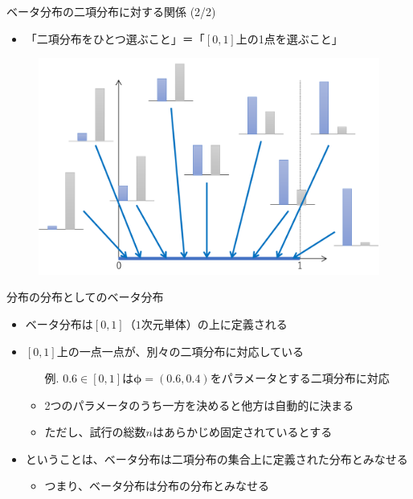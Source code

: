 \documentclass[aspectratio=169,unicode,dvipdfmx,14pt]{beamer}
\begin{document}
\begin{frame}{ベータ分布の二項分布に対する関係 (2/2)}
\begin{itemize}
\item 「二項分布をひとつ選ぶこと」＝「$[0,1]$上の1点を選ぶこと」
\end{itemize}
\begin{figure}[t]
\begin{center}
\includegraphics[scale=0.13]{beta2.png}
\end{center}
\end{figure}
\end{frame}

\begin{frame}{分布の分布としてのベータ分布}
\begin{itemize}
\item ベータ分布は$[0,1]$（$1$次元単体）の上に定義される
\item $[0,1]$上の一点一点が、別々の二項分布に対応している
\begin{itemize}
\item[例.] $0.6\in[0,1]$は$\bm{\phi}=(0.6,0.4)$をパラメータとする二項分布に対応
\item 2つのパラメータのうち一方を決めると他方は自動的に決まる
\item ただし、試行の総数$n$はあらかじめ固定されているとする
\end{itemize}
\item ということは、ベータ分布は二項分布の集合上に定義された分布とみなせる
\begin{itemize}
\item つまり、ベータ分布は分布の分布とみなせる
\end{itemize}
\end{itemize}
\end{frame}
\end{document}
